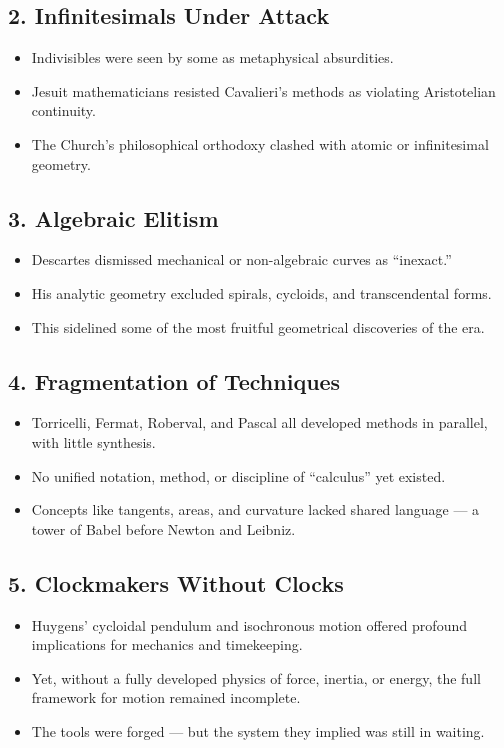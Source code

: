 \documentclass[9pt]{article}
\begin{document}
\subsection*{2. Infinitesimals Under Attack}
\begin{itemize}
  \item Indivisibles were seen by some as metaphysical absurdities.
  \item Jesuit mathematicians resisted Cavalieri’s methods as violating Aristotelian continuity.
  \item The Church’s philosophical orthodoxy clashed with atomic or infinitesimal geometry.
\end{itemize}

\subsection*{3. Algebraic Elitism}
\begin{itemize}
  \item Descartes dismissed mechanical or non-algebraic curves as “inexact.”
  \item His analytic geometry excluded spirals, cycloids, and transcendental forms.
  \item This sidelined some of the most fruitful geometrical discoveries of the era.
\end{itemize}

\subsection*{4. Fragmentation of Techniques}
\begin{itemize}
  \item Torricelli, Fermat, Roberval, and Pascal all developed methods in parallel, with little synthesis.
  \item No unified notation, method, or discipline of “calculus” yet existed.
  \item Concepts like tangents, areas, and curvature lacked shared language — a tower of Babel before Newton and Leibniz.
\end{itemize}

\subsection*{5. Clockmakers Without Clocks}
\begin{itemize}
  \item Huygens’ cycloidal pendulum and isochronous motion offered profound implications for mechanics and timekeeping.
  \item Yet, without a fully developed physics of force, inertia, or energy, the full framework for motion remained incomplete.
  \item The tools were forged — but the system they implied was still in waiting.
\end{itemize}
\end{document}
